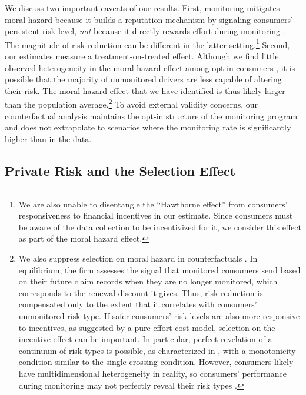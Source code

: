 We discuss two important caveats of our results. First, monitoring mitigates moral hazard because it builds a reputation mechanism by signaling consumers' persistent risk level, \textit{not} because it directly rewards effort during monitoring
. The magnitude of risk reduction can be different in the latter setting.\footnote{We are also unable to disentangle the ``Hawthorne effect'' from consumers' responsiveness to financial incentives in our estimate. Since consumers must be aware of the data collection to be incentivized for it, we consider this effect as part of the moral hazard effect.}
Second, our estimates measure a treatment-on-treated effect. Although we find little observed heterogeneity in the moral hazard effect among opt-in consumers
, it is possible that the majority of unmonitored drivers are less capable of altering their risk. The moral hazard effect that we have identified is thus likely larger than the population average.\footnote{We also suppress selection on moral hazard in counterfactuals \parencite{Einav2013}. In equilibrium, the firm assesses the signal that monitored consumers send based on their future claim records when they are no longer monitored, which corresponds to the renewal discount it gives. Thus, risk reduction is compensated only to the extent that it correlates with consumers' unmonitored risk type. If safer consumers' risk levels are also more responsive to incentives, as suggested by a pure effort cost model, selection on the incentive effect can be important. In particular, perfect revelation of a continuum of risk types is possible, as characterized in \textcite{mailath1987incentive}, with a monotonicity condition similar to the single-crossing condition. However, consumers likely have multidimensional heterogeneity in reality, so consumers' performance during monitoring may not perfectly reveal their risk types \parencite{frankel2014muddled}.} To avoid external validity concerns, our counterfactual analysis maintains the opt-in structure of the monitoring program and does not extrapolate to scenarios where the monitoring rate is significantly higher than in the data.

\subsection{Private Risk and the Selection Effect\label{subsec:rf_selection}}

